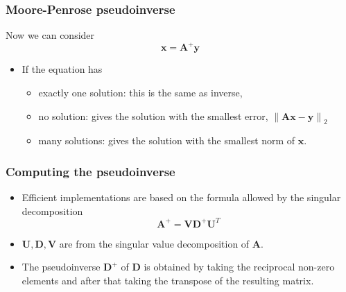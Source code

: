 \documentclass[notes]{beamer}          %
\newcommand{\vect}[1]{\bm{#1}}
\newcommand{\norm}[1]{\left\lVert#1\right\rVert}
\providecommand{\norm}[1]{\lVert#1\rVert}
\newif\iffull
\begin{document}
\begin{frame}
\frametitle{Moore-Penrose pseudoinverse}
    Now we can consider
    $$\vect{x} = \vect{A}^{+} \vect{y}$$
    \begin{itemize}
        \item If the equation has
            \begin{itemize}
                \item exactly one solution: this is the same as inverse,
                \item no solution: gives the solution with the smallest error, $\norm{\vect{A}\vect{x} - \vect{y}}_2$
                \item many solutions: gives the solution with the smallest norm of $\vect{x}$.
            \end{itemize}
    \end{itemize}

\end{frame}

\begin{frame}
\frametitle{Computing the pseudoinverse}
    \begin{itemize}
        \item Efficient implementations are based on the formula allowed by the singular decomposition
        $$
        \vect{A}^{+} = \vect{V}\vect{D}^{+}\vect{U}^T
        $$
        \item $\vect{U},\vect{D},\vect{V}$ are from the singular value decomposition of $\vect{A}$.
        \item The pseudoinverse $\vect{D}^{+}$ of $\vect{D}$ is obtained by taking the reciprocal non-zero elements and after that taking the transpose of the resulting matrix.
    \end{itemize}

\end{frame}

\iffull
\begin{frame}
\frametitle{Trace}
    \begin{itemize}
        \item A {\bf trace} of a matrix is defined as
        $$Tr(\vect{A}) = \sum_{i} \vect{A}_{i,i} $$
        \item Expressions in terms of the trace operators allow to exploit many useful identities, e.g.
        $$Tr(\vect{A}\vect{B}\vect{C}) = Tr(\vect{B}\vect{C}\vect{A}) = Tr(\vect{C}\vect{A}\vect{B})$$
    \end{itemize}

\end{frame}
\fi
\end{document}
